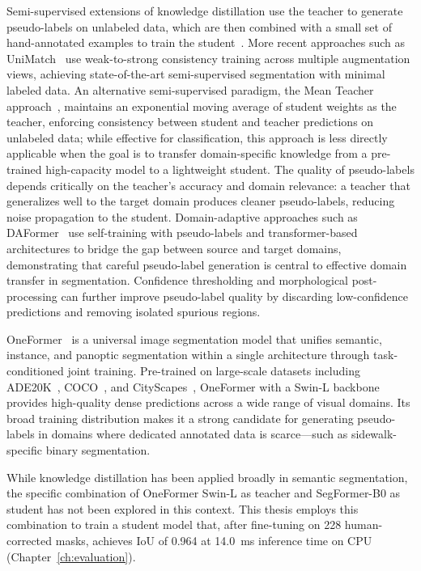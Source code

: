 \documentclass[12pt,letterpaper,oneside]{report}
\begin{document}
Semi-supervised extensions of knowledge distillation use the teacher to generate pseudo-labels on unlabeled data, which are then combined with a small set of hand-annotated examples to train the student~\cite{pseudolabel_lee2013}. More recent approaches such as UniMatch~\cite{yang2023unimatch} use weak-to-strong consistency training across multiple augmentation views, achieving state-of-the-art semi-supervised segmentation with minimal labeled data. An alternative semi-supervised paradigm, the Mean Teacher approach~\cite{mean_teacher}, maintains an exponential moving average of student weights as the teacher, enforcing consistency between student and teacher predictions on unlabeled data; while effective for classification, this approach is less directly applicable when the goal is to transfer domain-specific knowledge from a pre-trained high-capacity model to a lightweight student. The quality of pseudo-labels depends critically on the teacher's accuracy and domain relevance: a teacher that generalizes well to the target domain produces cleaner pseudo-labels, reducing noise propagation to the student. Domain-adaptive approaches such as DAFormer~\cite{hoyer2022daformer} use self-training with pseudo-labels and transformer-based architectures to bridge the gap between source and target domains, demonstrating that careful pseudo-label generation is central to effective domain transfer in segmentation. Confidence thresholding and morphological post-processing can further improve pseudo-label quality by discarding low-confidence predictions and removing isolated spurious regions.

OneFormer~\cite{oneformer} is a universal image segmentation model that unifies semantic, instance, and panoptic segmentation within a single architecture through task-conditioned joint training. Pre-trained on large-scale datasets including ADE20K~\cite{zhou2017ade20k}, COCO~\cite{coco}, and CityScapes~\cite{cityscapes}, OneFormer with a Swin-L backbone~\cite{liu2021swin} provides high-quality dense predictions across a wide range of visual domains. Its broad training distribution makes it a strong candidate for generating pseudo-labels in domains where dedicated annotated data is scarce---such as sidewalk-specific binary segmentation.

While knowledge distillation has been applied broadly in semantic segmentation, the specific combination of OneFormer Swin-L as teacher and SegFormer-B0 as student has not been explored in this context. This thesis employs this combination to train a student model that, after fine-tuning on 228 human-corrected masks, achieves IoU of 0.964 at 14.0~ms inference time on CPU (Chapter~\ref{ch:evaluation}).
\end{document}

